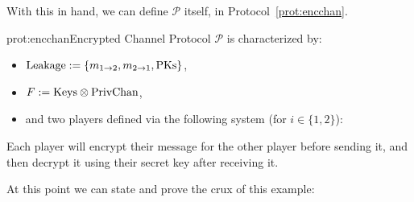 With this in hand, we can define $\mathscr{P}$ itself, in Protocol~\ref{prot:encchan}.

\begin{protocol}{prot:encchan}{Encrypted Channel Protocol}
    $\mathscr{P}$ is characterized by:
    \begin{itemize}
        \item $\text{Leakage} := \{m_{1\to 2}, m_{2\to1}, \text{PKs}\}$,
        \item $F := \text{Keys} \otimes \text{PrivChan}$,
        \item and two players defined via the following system (for $i \in \{1, 2\}$):
    \end{itemize}

\end{protocol}

Each player will encrypt their message for the other player before sending it,
and then decrypt it using their secret key after receiving it.

At this point we can state and prove the crux of this example:

